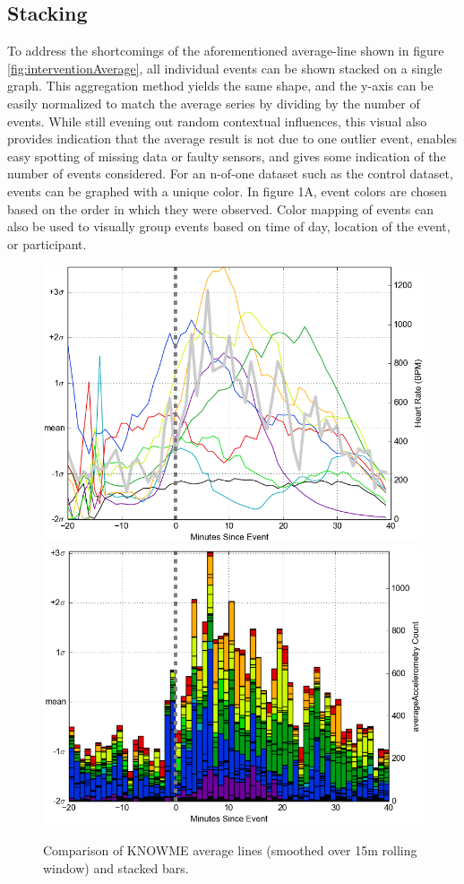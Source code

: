 \subsection{Stacking}
To address the shortcomings of the aforementioned average-line shown in figure \ref{fig:interventionAverage}, all individual events can be shown stacked on a single graph.
This aggregation method yields the same shape, and the y-axis can be easily normalized to match the average series by dividing by the number of events.
While still evening out random contextual influences, this visual also provides indication that the average result is not due to one outlier event, enables easy spotting of missing data or faulty sensors, and gives some indication of the number of events considered.
For an n-of-one dataset such as the control dataset, events can be graphed with a unique color.
In figure 1A, event colors are chosen based on the order in which they were observed.
Color mapping of events can also be used to visually group events based on time of day, location of the event, or participant.

\begin{figure}
\centering
\includegraphics[width=0.9\columnwidth]{./img/knowMe_60m_lines_smoothed15m.png}
\includegraphics[width=0.9\columnwidth]{./img/knowMe_60m_bars.png}
\caption{Comparison of KNOWME average lines (smoothed over 15m rolling window) and stacked bars.}
\label{fig:knowMeCompare}
\end{figure}

